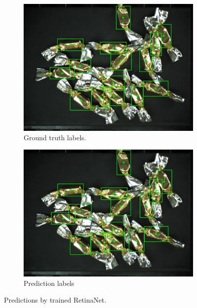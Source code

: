 \begin{figure}[ht]
\begin{subfigure}{0.5\textwidth}
  \end{subfigure}
  \begin{subfigure}{0.5\textwidth}
    \centering
    \includegraphics[width=0.92\linewidth]{Sources/Figures/appendix/actual_122.jpg}
    \caption{Ground truth labels.}

  \end{subfigure}
  \begin{subfigure}{0.5\textwidth}
    \centering
    \includegraphics[width=0.92\linewidth]{Sources/Figures/appendix/pred_122.jpg}
    \caption{Prediction labels}

  \end{subfigure}
  \caption{Predictions by trained RetinaNet.}
  \label{fig:candies_appendix2}
\end{figure}